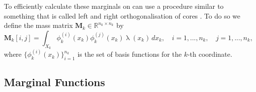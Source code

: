 To efficiently calculate these marginals on can use a procedure similar to something that is called left and right orthogonalisation of cores \cite{oseledets2011tensor}.
To do so we define the mass matrix $\bm{M}_k \in \mathbb{R}^{n_k \times n_k}$ by
\begin{equation}
	\bm{M}_k[i, j] = \int_{X_k} \phi^{(i)}_k(x_k) \phi^{(j)}_k(x_k)  \uplambda(x_k) \,dx_k, \quad i = 1, ..., n_k, \quad j = 1, ..., n_k,
\end{equation}
where $\{\phi^{(i)}_k(x_k)\}_{i=1}^{n_k}$ is the set of basis functions for the $k$-th coordinate.




\subsection{Marginal Functions}

